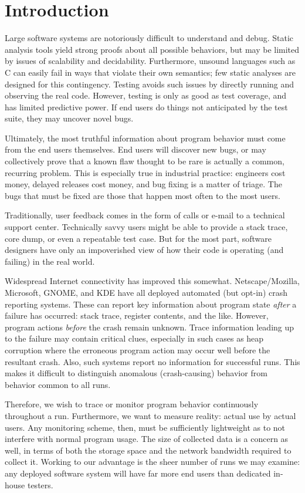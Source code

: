 \section{Introduction}

Large software systems are notoriously difficult to understand and
debug.  Static analysis tools yield strong proofs about all possible
behaviors, but may be limited by issues of scalability and
decidability.  Furthermore, unsound languages such as C can easily
fail in ways that violate their own semantics; few static analyses are
designed for this contingency.  Testing avoids such issues by directly
running and observing the real code.  However, testing is only as good
as test coverage, and has limited predictive power.  If end users do
things not anticipated by the test suite, they may uncover novel bugs.

Ultimately, the most truthful information about program behavior must
come from the end users themselves.  End users will discover new bugs,
or may collectively prove that a known flaw thought to be rare is
actually a common, recurring problem.  This is especially true in
industrial practice: engineers cost money, delayed releases cost
money, and bug fixing is a matter of triage.  The bugs that must be
fixed are those that happen most often to the most users.

Traditionally, user feedback comes in the form of calls or e-mail to a
technical support center.  Technically savvy users might be able to
provide a stack trace, core dump, or even a repeatable test case.  But
for the most part, software designers have only an impoverished view
of how their code is operating (and failing) in the real world.

Widespread Internet connectivity has improved this somewhat.
Netscape/Mozilla, Microsoft, GNOME, and KDE have all deployed
automated (but opt-in) crash reporting systems.  These can report key
information about program state \emph{after} a failure has occurred:
stack trace, register contents, and the like.  However, program
actions \emph{before} the crash remain unknown.  Trace information
leading up to the failure may contain critical clues, especially in
such cases as heap corruption where the erroneous program action may
occur well before the resultant crash.  Also, such systems report no
information for successful runs.  This makes it difficult to
distinguish anomalous (crash-causing) behavior from behavior common to
all runs.

Therefore, we wish to trace or monitor program behavior continuously
throughout a run.  Furthermore, we want to measure reality: actual use
by actual users.  Any monitoring scheme, then, must be sufficiently
lightweight as to not interfere with normal program usage.  The size
of collected data is a concern as well, in terms of both the storage
space and the network bandwidth required to collect it.  Working to
our advantage is the sheer number of runs we may examine: any deployed
software system will have far more end users than dedicated in-house
testers.

